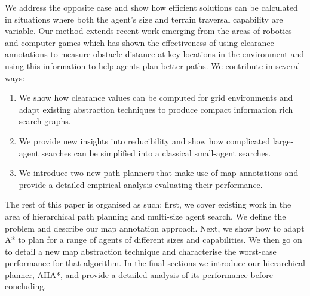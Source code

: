 We address the opposite case and show how efficient solutions can be calculated in situations where both the agent's size and terrain traversal capability are variable. Our method extends recent work emerging from the areas of robotics and computer games which has shown the effectiveness of using clearance annotations to measure obstacle distance at key locations in the environment and using this information to help agents plan better paths. We contribute in several ways:
\begin{enumerate}
\item{We show how clearance values can be computed for grid environments and adapt existing abstraction techniques to produce compact information rich search graphs.}
\item{We provide new insights into reducibility and show how complicated large-agent searches can be simplified into a classical small-agent searches.}
\item{We introduce two new path planners that make use of map annotations and provide a detailed empirical analysis evaluating their performance. }
\end{enumerate} 

The rest of this paper is organised as such: first, we cover existing work in the area of hierarchical path planning and multi-size agent search. We define the problem and describe our map annotation approach. Next, we show how to adapt A* to plan for a range of agents of different sizes and capabilities. We then go on to detail a new map abstraction technique and characterise the worst-case performance for that algorithm. In the final sections we introduce our hierarchical planner, AHA*, and provide a detailed analysis of its performance before concluding.
